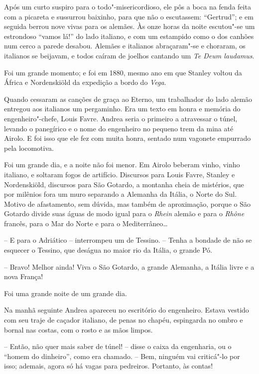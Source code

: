 Após um curto suspiro para o todo"-misericordioso, ele pôs a boca na
fenda feita com a picareta e sussurrou baixinho, para que não o
escutassem: ``Gertrud''; e em seguida berrou nove vivas para os alemães.
Às onze horas da noite escutou"-se um estrondoso ``vamos lá!'' do lado
italiano, e com um estampido como o dos canhões num cerco a parede
desabou. Alemães e italianos abraçaram"-se e \mbox{choraram}, os italianos se
beijavam, e todos caíram de joelhos cantando um \textit{Te Deum
laudamus}.

Foi um grande momento; e foi em 1880, mesmo ano em que Stanley voltou da
África e Nordenskiöld da expedição a bordo do \textit{Vega}.

Quando cessaram as canções de graça ao Eterno, um trabalhador do lado
alemão entregou aos italianos um pergaminho. Era um
texto em honra e memória do engenheiro"-chefe, Louis Favre. Andrea
seria o primeiro a atravessar o túnel, levando o panegírico e o nome do
engenheiro no pequeno trem da mina até Airolo. E foi isso que ele fez
com muita honra, sentado num vagonete empurrado pela locomotiva.

Foi um grande dia, e a noite não foi menor. Em Airolo beberam vinho,
vinho italiano, e soltaram fogos de artifício. Discursos para Louis
Favre, Stanley e Nordenskiöld, discursos para São Gotardo, a montanha
cheia de mistérios, que por milênios fora um muro separando a Alemanha
da Itália, o Norte do Sul. Motivo de afastamento, sem dúvida, mas
também de aproximação, porque o São Gotardo divide suas águas de modo
igual para o \textit{Rhein} alemão e para o \textit{Rhône} francês,
para o Mar do Norte e para o Mediterrâneo\ldots{}

-- E para o Adriático -- interrompeu um de Tessino. -- Tenha a bondade de
não se esquecer o Tessino, que deságua no maior rio da Itália, o grande
Pó.

-- Bravo! Melhor ainda! Viva o São Gotardo, a grande Alemanha, a Itália
livre e a nova França!

Foi uma grande noite de um grande dia.
\asterisc


Na manhã seguinte Andrea apareceu no escritório do engenheiro. Estava
vestido com seu traje de caçador italiano, de penas no chapéu,
espingarda no ombro e bornal nas costas, com o rosto e as mãos limpos.

-- Então, não quer mais saber de túnel! -- disse o caixa da engenharia, ou
o ``homem do dinheiro'', como era chamado. -- Bem, ninguém vai
criticá"-lo por isso; ademais, agora só há vagas para pedreiros.
Portanto, às contas!

